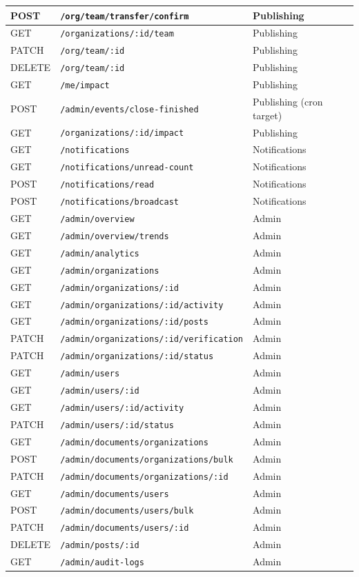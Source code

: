 \begin{longtable}{|p{}|p{}|p{}|}
POST & \texttt{/org/team/transfer/confirm} & Publishing\\\hline
GET & \texttt{/organizations/:id/team} & Publishing\\\hline
PATCH & \texttt{/org/team/:id} & Publishing\\\hline
DELETE & \texttt{/org/team/:id} & Publishing\\\hline
GET & \texttt{/me/impact} & Publishing\\\hline
POST & \texttt{/admin/events/close-finished} & Publishing (cron target)\\\hline
GET & \texttt{/organizations/:id/impact} & Publishing\\\hline
GET & \texttt{/notifications} & Notifications\\\hline
GET & \texttt{/notifications/unread-count} & Notifications\\\hline
POST & \texttt{/notifications/read} & Notifications\\\hline
POST & \texttt{/notifications/broadcast} & Notifications\\\hline
GET & \texttt{/admin/overview} & Admin\\\hline
GET & \texttt{/admin/overview/trends} & Admin\\\hline
GET & \texttt{/admin/analytics} & Admin\\\hline
GET & \texttt{/admin/organizations} & Admin\\\hline
GET & \texttt{/admin/organizations/:id} & Admin\\\hline
GET & \texttt{/admin/organizations/:id/activity} & Admin\\\hline
GET & \texttt{/admin/organizations/:id/posts} & Admin\\\hline
PATCH & \texttt{/admin/organizations/:id/verification} & Admin\\\hline
PATCH & \texttt{/admin/organizations/:id/status} & Admin\\\hline
GET & \texttt{/admin/users} & Admin\\\hline
GET & \texttt{/admin/users/:id} & Admin\\\hline
GET & \texttt{/admin/users/:id/activity} & Admin\\\hline
PATCH & \texttt{/admin/users/:id/status} & Admin\\\hline
GET & \texttt{/admin/documents/organizations} & Admin\\\hline
POST & \texttt{/admin/documents/organizations/bulk} & Admin\\\hline
PATCH & \texttt{/admin/documents/organizations/:id} & Admin\\\hline
GET & \texttt{/admin/documents/users} & Admin\\\hline
POST & \texttt{/admin/documents/users/bulk} & Admin\\\hline
PATCH & \texttt{/admin/documents/users/:id} & Admin\\\hline
DELETE & \texttt{/admin/posts/:id} & Admin\\\hline
GET & \texttt{/admin/audit-logs} & Admin\\\hline
\end{longtable}

